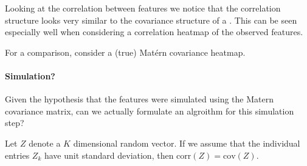\documentclass[letterpaper,10pt,english]{sphinxmanual}
\begin{document}
Looking at the correlation between features we notice that the correlation structure looks very similar to the covariance structure of a . This can be seen especially well when considering a correlation heatmap of the observed features.

\begin{sphinxVerbatim}[commandchars=\\\{\}]
\end{sphinxVerbatim}

\noindent{}

For a comparison, consider a (true) Matérn covariance heatmap.

\begin{sphinxVerbatim}[commandchars=\\\{\}]
   

     
  

\end{sphinxVerbatim}

\noindent{}


\paragraph{Simulation?}
\label{\detokenize{simulated_reverse_engineering:simulation}}
Given the hypothesis that the features were simulated using the Matern covariance matrix, can we actually formulate an algroithm for this simulation step?

Let \(Z\) denote a \(K\) dimensional random vector.
If we assume that the individual entries \(Z_k\) have unit standard deviation, then \(\text{corr}(Z) = \text{cov}(Z)\).
\end{document}
